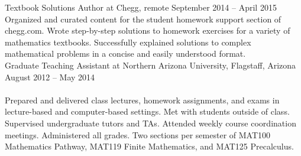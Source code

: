 \documentclass[10pt]{article}
\begin{document}
\noindent Textbook Solutions Author at Chegg, remote \hfill September 2014 -- April 2015 \\
\indent Organized and curated content for the student homework support section of chegg.com. Wrote step-by-step solutions to homework exercises for a variety of mathematics textbooks. Successfully explained solutions to complex mathematical problems in a concise and easily understood format.\\


%
%

\noindent Graduate Teaching Assistant at Northern Arizona University, Flagstaff, Arizona \hfill August 2012 -- May 2014 \\
 \\
\indent Prepared and delivered class lectures, homework assignments, and exams in  lecture-based and computer-based settings. Met with students outside of class. Supervised undergraduate tutors and TAs. Attended weekly course coordination meetings. Administered all grades. Two sections per semester of MAT100 Mathematics Pathway, MAT119 Finite Mathematics, and MAT125 Precalculus. \\
\end{document}
